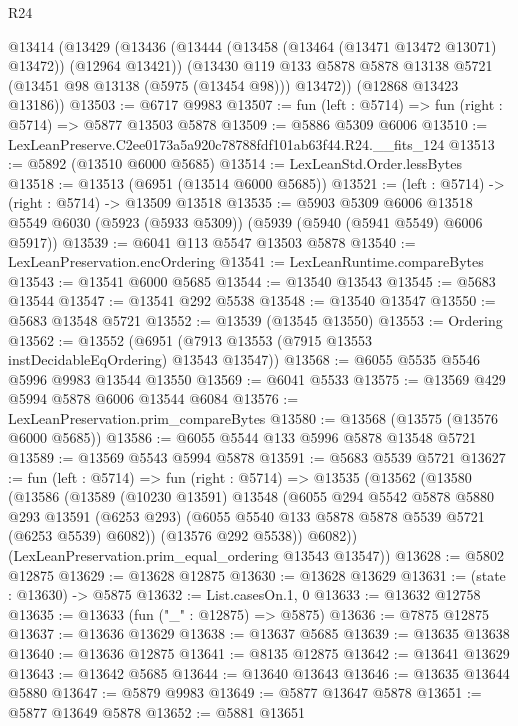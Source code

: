 \begin{lexlean}{R24}
\begin{coremodule}
  @13414
    (@13429
      (@13436
        (@13444 (@13458 (@13464 (@13471 @13472 @13071) @13472)) (@12964 @13421))
        (@13430 @119 @133 @5878 @5878 @13138 @5721 (@13451 @98 @13138 (@5975 (@13454 @98))) @13472))
      (@12868 @13423 @13186))
@13503 := @6717 @9983
@13507 := fun (left : @5714) => fun (right : @5714) => @5877 @13503 @5878
@13509 := @5886 @5309 @6006
@13510 := LexLeanPreserve.C2ee0173a5a920c78788fdf101ab63f44.R24.__fits_124
@13513 := @5892 (@13510 @6000 @5685)
@13514 := LexLeanStd.Order.lessBytes
@13518 := @13513 (@6951 (@13514 @6000 @5685))
@13521 := (left : @5714) -> (right : @5714) -> @13509 @13518
@13535 := @5903
    @5309
    @6006
    @13518
    @5549
    @6030
    (@5923 (@5933 @5309))
    (@5939 (@5940 (@5941 @5549) @6006 @5917))
@13539 := @6041 @113 @5547 @13503 @5878
@13540 := LexLeanPreservation.encOrdering
@13541 := LexLeanRuntime.compareBytes
@13543 := @13541 @6000 @5685
@13544 := @13540 @13543
@13545 := @5683 @13544
@13547 := @13541 @292 @5538
@13548 := @13540 @13547
@13550 := @5683 @13548 @5721
@13552 := @13539 (@13545 @13550)
@13553 := Ordering
@13562 := @13552 (@6951 (@7913 @13553 (@7915 @13553 instDecidableEqOrdering) @13543 @13547))
@13568 := @6055 @5535 @5546 @5996 @9983 @13544 @13550
@13569 := @6041 @5533
@13575 := @13569 @429 @5994 @5878 @6006 @13544 @6084
@13576 := LexLeanPreservation.prim_compareBytes
@13580 := @13568 (@13575 (@13576 @6000 @5685))
@13586 := @6055 @5544 @133 @5996 @5878 @13548 @5721
@13589 := @13569 @5543 @5994 @5878
@13591 := @5683 @5539 @5721
@13627 := fun (left : @5714) =>
  fun (right : @5714) =>
  @13535
    (@13562
      (@13580
        (@13586
          (@13589
            (@10230 @13591)
            @13548
            (@6055
              @294
              @5542
              @5878
              @5880
              @293
              @13591
              (@6253 @293)
              (@6055 @5540 @133 @5878 @5878 @5539 @5721 (@6253 @5539) @6082))
            (@13576 @292 @5538))
          @6082))
      (LexLeanPreservation.prim_equal_ordering @13543 @13547))
@13628 := @5802 @12875
@13629 := @13628 @12875
@13630 := @13628 @13629
@13631 := (state : @13630) -> @5875
@13632 := List.casesOn.{1, 0}
@13633 := @13632 @12758
@13635 := @13633 (fun ("_" : @12875) => @5875)
@13636 := @7875 @12875
@13637 := @13636 @13629
@13638 := @13637 @5685
@13639 := @13635 @13638
@13640 := @13636 @12875
@13641 := @8135 @12875
@13642 := @13641 @13629
@13643 := @13642 @5685
@13644 := @13640 @13643
@13646 := @13635 @13644 @5880
@13647 := @5879 @9983
@13649 := @5877 @13647 @5878
@13651 := @5877 @13649 @5878
@13652 := @5881 @13651

\end{coremodule}
\end{lexlean}
